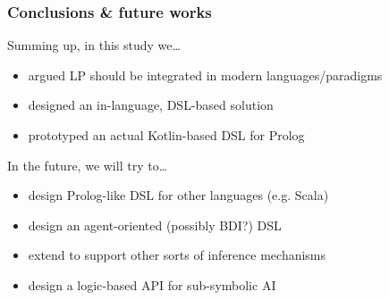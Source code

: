 \documentclass[presentation]{beamer}
\begin{document}
\begin{frame}%
\frametitle{Conclusions \& future works}

\begin{block}{Summing up, in this study we\ldots}
    \begin{itemize}
        \item argued LP should be integrated in modern languages/paradigms
        \item designed an in-language, DSL-based solution
        \item prototyped an actual Kotlin-based DSL for Prolog
    \end{itemize}
\end{block}

\begin{exampleblock}{In the future, we will try to\ldots}
    \begin{itemize}
        \item design Prolog-like DSL for other languages (e.g. Scala)
        \item design an agent-oriented (possibly BDI?) DSL
        \item extend \twopkt{} to support other sorts of inference mechanisms
        \item design a logic-based API for sub-symbolic AI
    \end{itemize}
\end{exampleblock}

\end{frame}

\section*{}
\frame{\titlepage}
\end{document}
